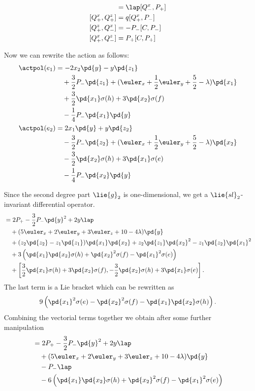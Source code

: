 \begin{appendices}
\begin{align}
[Q_-^x, Q_-^z] & = \lap [Q_-^x, P_+] \\
[Q_+^x, Q_+^z] & = q [Q_+^x, P_-] \\
[Q_+^z, Q_-^x] & = -P_-[C, P_-] \\
[Q_+^x, Q_-^z] & = P_+[C, P_+]
\end{align}

Now we can rewrite the action as follows:
\begin{align}
    \actpol(e_1) &= -2 x_2 \pd{y} - y \pd{z_1} \\
             & \quad + \frac{3}{2} P_- \pd{z_1} + ( \euler_x + \frac{1}{2}\euler_y + \frac{5}{2} - \lambda)\pd{x_1} \\
             & \quad + \frac{3}{2} \pd{x_1}\sigma(h) + 3 \pd{x_2} \sigma(f) \\
             & \quad - \frac{1}{4} P_- \pd{x_1}\pd{y}\\
    \actpol(e_2) &= 2 x_1 \pd{y} + y \pd{z_2} \\
             & \quad - \frac{3}{2} P_- \pd{z_2} + ( \euler_x + \frac{1}{2}\euler_y + \frac{5}{2} - \lambda)\pd{x_2} \\
             & \quad - \frac{3}{2} \pd{x_2} \sigma(h) + 3 \pd{x_1} \sigma(e) \\
             & \quad - \frac{1}{4} P_- \pd{x_2}\pd{y}
\end{align}

Since the second degree part $\lie{g}_2$ is one-dimensional, we get a $\lie{sl}_2$-invariant differential operator.
\begin{align}
[\actpol(e_1), \actpol(e_2)] & = 2 P_+ - \frac{3}{2}P_-\pd{y}^2 + 2y\lap \\
& \quad + (5\euler_x + 2\euler_y + 3\euler_z + 10 - 4\lambda)\pd{y} \\
& \quad + (z_2\pd{z_2} - z_1\pd{z_1})\pd{x_1}\pd{x_2} + z_2\pd{z_1}\pd{x_2}^2 - z_1\pd{z_2}\pd{x_1}^2 \\
& \quad + 3\left(\pd{x_1}\pd{x_2}\sigma(h) + \pd{x_2}^2 \sigma(f) - \pd{x_1}^2 \sigma(e) \right) \\
& \quad + \left[\frac{3}{2} \pd{x_1}\sigma(h) + 3 \pd{x_2} \sigma(f), - \frac{3}{2} \pd{x_2} \sigma(h) + 3 \pd{x_1} \sigma(e) \right].
\end{align}
The last term is a Lie bracket which can be rewritten as
\begin{equation}
9\left(\pd{x_1}^2\sigma(e) - \pd{x_2}^2\sigma(f) - \pd{x_1}\pd{x_2}  \sigma(h) \right).
\end{equation}
Combining the vectorial terms together we obtain after some further manipulation
\begin{align}
[\actpol(e_1), \actpol(e_2)] & = 2 P_+ - \frac{3}{2}P_-\pd{y}^2 + 2y\lap \\
& \quad + (5\euler_x + 2\euler_y + 3\euler_z + 10 - 4\lambda)\pd{y} \\
& \quad - P_- \lap\\
& \quad - 6\left(\pd{x_1}\pd{x_2}\sigma(h) + \pd{x_2}^2 \sigma(f) - \pd{x_1}^2 \sigma(e) \right)
\end{align}


\end{appendices}
